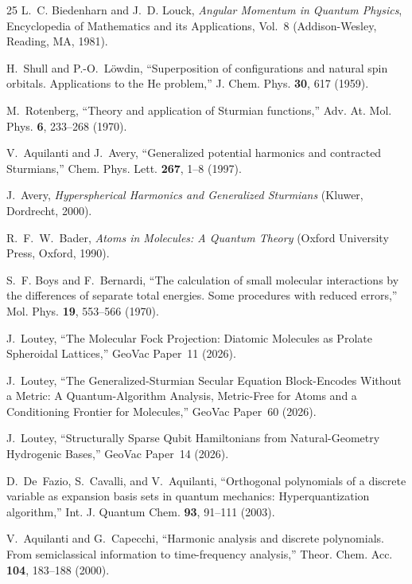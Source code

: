 \documentclass[aps,pra,twocolumn,superscriptaddress,longbibliography]{revtex4-2}
\theoremstyle{remark}
\theoremstyle{plain}
\begin{document}
\begin{thebibliography}{25}
L.~C. Biedenharn and J.~D. Louck,
\textit{Angular Momentum in Quantum Physics},
Encyclopedia of Mathematics and its Applications, Vol.~8
(Addison-Wesley, Reading, MA, 1981).

H.~Shull and P.-O.~L\"owdin,
``Superposition of configurations and natural spin orbitals.
Applications to the He problem,''
J. Chem. Phys. \textbf{30}, 617 (1959).

M.~Rotenberg,
``Theory and application of Sturmian functions,''
Adv. At. Mol. Phys. \textbf{6}, 233--268 (1970).

V.~Aquilanti and J.~Avery,
``Generalized potential harmonics and contracted Sturmians,''
Chem. Phys. Lett. \textbf{267}, 1--8 (1997).

J.~Avery,
\textit{Hyperspherical Harmonics and Generalized Sturmians}
(Kluwer, Dordrecht, 2000).

R.~F.~W.~Bader,
\textit{Atoms in Molecules: A Quantum Theory}
(Oxford University Press, Oxford, 1990).

S.~F. Boys and F.~Bernardi,
``The calculation of small molecular interactions by the differences
of separate total energies. Some procedures with reduced errors,''
Mol. Phys. \textbf{19}, 553--566 (1970).

J.~Loutey,
``The Molecular Fock Projection: Diatomic Molecules as Prolate
Spheroidal Lattices,''
GeoVac Paper~11 (2026).

J.~Loutey,
``The Generalized-Sturmian Secular Equation Block-Encodes Without a
Metric: A Quantum-Algorithm Analysis, Metric-Free for Atoms and a
Conditioning Frontier for Molecules,''
GeoVac Paper~60 (2026).

J.~Loutey,
``Structurally Sparse Qubit Hamiltonians from Natural-Geometry Hydrogenic Bases,''
GeoVac Paper~14 (2026).

D.~De~Fazio, S.~Cavalli, and V.~Aquilanti,
``Orthogonal polynomials of a discrete variable as expansion basis
sets in quantum mechanics: Hyperquantization algorithm,''
Int. J. Quantum Chem. \textbf{93}, 91--111 (2003).

V.~Aquilanti and G.~Capecchi,
``Harmonic analysis and discrete polynomials. From semiclassical
information to time-frequency analysis,''
Theor. Chem. Acc. \textbf{104}, 183--188 (2000).


\end{thebibliography}
\end{document}
